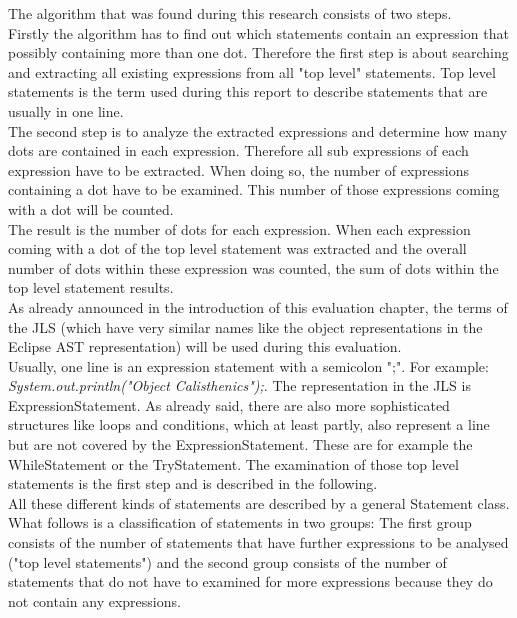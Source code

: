 The algorithm that was found during this research consists of two steps. 
\\

Firstly the algorithm has to find out which statements contain an expression that possibly containing more than one dot. Therefore the first step is about searching and extracting all existing expressions from all "top level" statements. Top level statements is the term used during this report to describe statements that are usually in one line. 
\\

The second step is to analyze the extracted expressions and determine how many dots are contained in each expression. Therefore all sub expressions of each expression have to be extracted. When doing so, the number of expressions containing a dot have to be examined. This number of those expressions coming with a dot will be counted. 
\\

The result is the number of dots for each expression. When each expression coming with a dot of the top level statement was extracted and the overall number of dots within these expression was counted, the sum of dots within the top level statement results. 
\\

As already announced in the introduction of this evaluation chapter, the terms of the \acf{JLS} (which have very similar names like the object representations in the Eclipse \acf{AST} representation) will be used during this evaluation. 
\\

Usually, one line is an expression statement with a semicolon ";". For example: \textit{System.out.println("Object Calisthenics");}. The representation in the \acf{JLS} is ExpressionStatement. As already said, there are also more sophisticated structures like loops and conditions, which at least partly, also represent a line but are not covered by the ExpressionStatement. These are for example the WhileStatement or the TryStatement. The examination of those top level statements is the first step and is described in the following.
\\

All these different kinds of statements are described by a general Statement class. What follows is a classification of statements in two groups: The first group consists of the number of statements that have further expressions to be analysed ("top level statements") and the second group consists of the number of statements that do not have to examined for more expressions because they do not contain any expressions. 
\\

